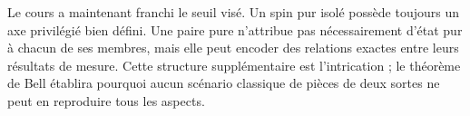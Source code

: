 \begin{classroomqa}
\end{classroomqa}

Le cours a maintenant franchi le seuil visé. Un spin pur isolé possède toujours un axe privilégié bien défini. Une paire pure n’attribue pas nécessairement d’état pur à chacun de ses membres, mais elle peut encoder des relations exactes entre leurs résultats de mesure. Cette structure supplémentaire est l’intrication ; le théorème de Bell établira pourquoi aucun scénario classique de pièces de deux sortes ne peut en reproduire tous les aspects.